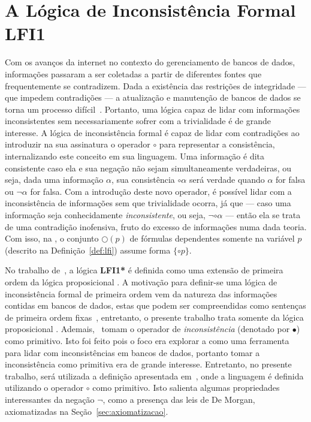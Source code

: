 \chapter{A Lógica de Inconsistência Formal LFI1}\label{cap:LFI1}

Com os avanços da internet no contexto do gerenciamento de bancos de dados, informações passaram a ser coletadas a partir de diferentes fontes que frequentemente se contradizem. Dada a existência das restrições de integridade {---} que impedem contradições {---} a atualização e manutenção de bancos de dados se torna um processo difícil~\cite{carnielli2000formal}. Portanto, uma lógica capaz de lidar com informações inconsistentes sem necessariamente sofrer com a trivialidade é de grande interesse. A lógica de inconsistência formal \lfium{} é capaz de lidar com contradições ao introduzir na sua assinatura o operador $\circ$ para representar a consistência, internalizando este conceito em sua linguagem. Uma informação é dita consistente caso ela e sua negação não sejam simultaneamente verdadeiras, ou seja, dada uma informação $\alpha$, sua consistência $\circ \alpha$ será verdade quando $\alpha$ for falsa ou $\neg \alpha$ for falsa. Com a introdução deste novo operador, é possível lidar com a inconsistência de informações sem que trivialidade ocorra, já que {---} caso uma informação seja conhecidamente \textit{inconsistente}, ou seja, $\neg \circ \alpha$ {---} então ela se trata de uma contradição inofensiva, fruto do excesso de informações numa dada teoria. Com isso, na \lfium{}, o conjunto $\bigcirc(p)$ de fórmulas dependentes somente na variável $p$ (descrito na Definição~\ref{def:lfi}) assume forma $\{\circ p\}$.

No trabalho de~, a lógica \textbf{LFI1*} é definida como uma extensão de primeira ordem da lógica proposicional \lfium{}. A motivação para definir-se uma lógica de inconsistência formal de primeira ordem vem da natureza das informações contidas em bancos de dados, estas que podem ser compreendidas como sentenças de primeira ordem fixas~\cite{Codd}, entretanto, o presente trabalho trata somente da lógica proposicional \lfium{}. Ademais,~ tomam o operador de \textit{inconsistência} (denotado por $\bullet$) como primitivo. Isto foi feito pois o foco era explorar a \lfium{} como uma ferramenta para lidar com inconsistências em bancos de dados, portanto tomar a inconsistência como primitiva era de grande interesse. Entretanto, no presente trabalho, será utilizada a definição apresentada em~, onde a linguagem é definida utilizando o operador $\circ$ como primitivo. Isto salienta algumas propriedades interessantes da negação $\neg$, como a presença das leis de De Morgan, axiomatizadas na Seção~\ref{sec:axiomatizacao}.

